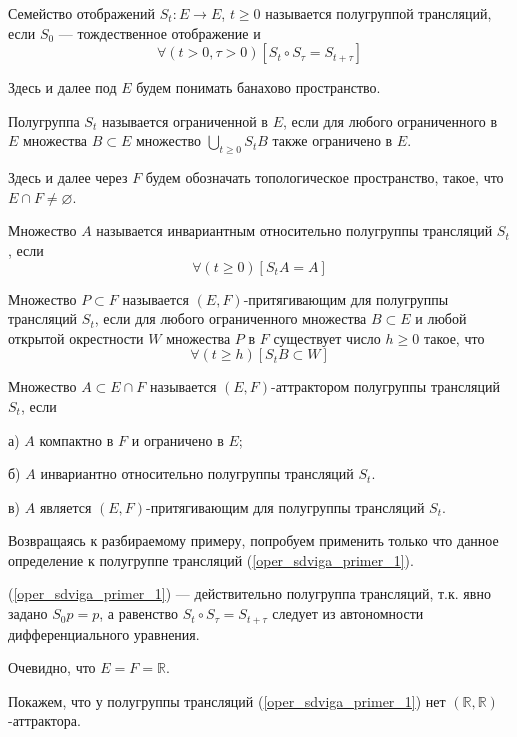 Семейство отображений $S_t : E \to E$, $t \geq 0$ называется полугруппой трансляций,
если $S_0$ --- тождественное отображение и
$$
	\forall(t>0,\tau>0)[S_t \circ S_\tau = S_{t+\tau}]
$$

Здесь и далее под $E$ будем понимать банахово пространство.

\opred

Полугруппа $S_t$ называется ограниченной в $E$, если для любого ограниченного в $E$ множества $B \subset E$ множество $\bigcup\limits_{t\geq0}S_t B$ также ограничено в $E$.

Здесь и далее через $F$ будем обозначать топологическое пространство, такое, что $E \cap F \ne \varnothing$.

\opred

Множество $A$ называется инвариантным относительно полугруппы трансляций $S_t$, если
$$
	\forall(t\geq 0)[S_t A = A]
$$

\opred

Множество $P \subset F$ называется $(E,F)$-притягивающим для полугруппы трансляций $S_t$,
если для любого ограниченного множества $B \subset E$ и любой открытой окрестности $W$ множества $P$ в $F$ существует число $h\geq 0$ такое, что
$$
	\forall(t \geq h)[S_t B \subset W]
$$


\opred

Множество $A\subset E\cap F$ называется $(E,F)$-аттрактором полугруппы трансляций $S_t$, если

а) $A$ компактно в $F$ и ограничено в $E$;

б) $A$ инвариантно относительно полугруппы трансляций $S_t$.

в) $A$ является $(E,F)$-притягивающим для полугруппы трансляций $S_t$.


Возвращаясь к разбираемому примеру, попробуем применить только что данное определение к полугруппе трансляций (\ref{oper_sdviga_primer_1}).

(\ref{oper_sdviga_primer_1}) --- действительно полугруппа трансляций, т.к. явно задано $S_0 p = p$, а равенство $S_t \circ S_\tau = S_{t+\tau}$ следует из автономности дифференциального уравнения.

Очевидно, что $E=F=\mathbb{R}$.

Покажем, что у полугруппы трансляций (\ref{oper_sdviga_primer_1}) нет $(\mathbb{R},\mathbb{R})$-аттрактора.

